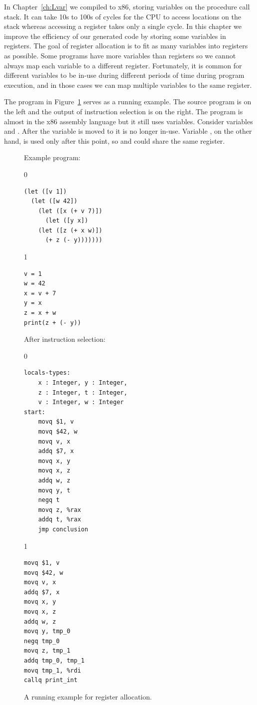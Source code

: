 \documentclass[7x10,nocrop]{TimesAPriori_MIT}%
\def\racketEd{0}
\def\pythonEd{1}
\def\edition{0}
\begin{document}

In Chapter~\ref{ch:Lvar} we compiled \LangVar{} to x86, storing
variables on the procedure call stack.  It can take 10s to 100s of
cycles for the CPU to access locations on the stack whereas accessing
a register takes only a single cycle. In this chapter we improve the
efficiency of our generated code by storing some variables in
registers. The goal of register allocation is to fit as many variables
into registers as possible. Some programs have more variables than
registers so we cannot always map each variable to a different
register. Fortunately, it is common for different variables to be
in-use during different periods of time during program execution, and
in those cases we can map multiple variables to the same register.

The program in Figure~\ref{fig:reg-eg} serves as a running
example. The source program is on the left and the output of
instruction selection is on the right. The program is almost in the
x86 assembly language but it still uses variables.  Consider variables
 and .  After the variable  is moved to
 it is no longer in-use.  Variable , on the other
hand, is used only after this point, so  and  could
share the same register.

\begin{figure}
\begin{minipage}{0.45\textwidth}
Example \LangVar{} program:
{\if\edition\racketEd
\begin{lstlisting}
(let ([v 1])
  (let ([w 42])
    (let ([x (+ v 7)])
      (let ([y x])
	(let ([z (+ x w)])
	  (+ z (- y)))))))
\end{lstlisting}
\fi}
{\if\edition\pythonEd
\begin{lstlisting}
v = 1
w = 42
x = v + 7
y = x
z = x + w
print(z + (- y))
\end{lstlisting}
\fi}
\end{minipage}
\begin{minipage}{0.45\textwidth}
After instruction selection:
{\if\edition\racketEd
\begin{lstlisting}
locals-types:
    x : Integer, y : Integer,
    z : Integer, t : Integer,
    v : Integer, w : Integer
start:
    movq $1, v
    movq $42, w
    movq v, x
    addq $7, x
    movq x, y
    movq x, z
    addq w, z
    movq y, t
    negq t
    movq z, %rax
    addq t, %rax
    jmp conclusion
\end{lstlisting}
\fi}
{\if\edition\pythonEd
\begin{lstlisting}
movq $1, v
movq $42, w
movq v, x
addq $7, x
movq x, y
movq x, z
addq w, z
movq y, tmp_0
negq tmp_0
movq z, tmp_1
addq tmp_0, tmp_1
movq tmp_1, %rdi
callq print_int
\end{lstlisting}
\fi}
\end{minipage}
\caption{A running example for register allocation.}
\label{fig:reg-eg}
\end{figure}
\end{document}
